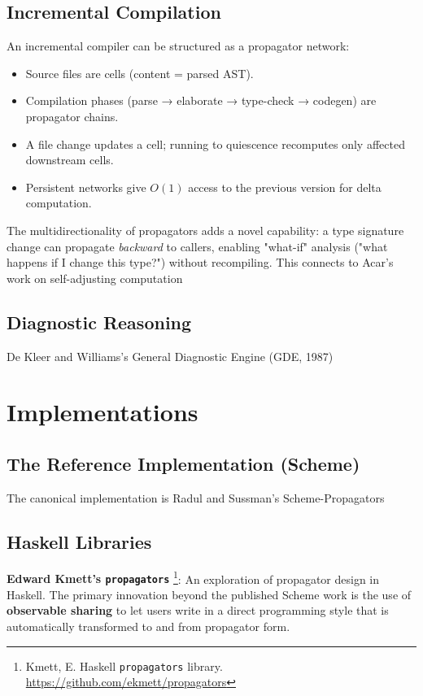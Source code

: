 \documentclass[11pt]{article}
\begin{document}
\subsection{Incremental Compilation}
\label{sec:orgc79f174}

An incremental compiler can be structured as a propagator network:

\begin{itemize}
\item Source files are cells (content = parsed AST).
\item Compilation phases (parse → elaborate → type-check → codegen) are
propagator chains.
\item A file change updates a cell; running to quiescence recomputes only
affected downstream cells.
\item Persistent networks give \(O(1)\) access to the previous version for
delta computation.
\end{itemize}

The multidirectionality of propagators adds a novel capability: a type
signature change can propagate \emph{backward} to callers, enabling "what-if"
analysis ("what happens if I change this type?") without recompiling.
This connects to Acar's work on self-adjusting computation
\subsection{Diagnostic Reasoning}
\label{sec:orgddc88f8}

De Kleer and Williams's General Diagnostic Engine (GDE, 1987)
\section{Implementations}
\label{sec:orgf1dc383}

\subsection{The Reference Implementation (Scheme)}
\label{sec:org7769237}

The canonical implementation is Radul and Sussman's Scheme-Propagators
\subsection{Haskell Libraries}
\label{sec:org9ae21d5}

\textbf{Edward Kmett's \texttt{propagators}} \footnote{Kmett, E. Haskell \texttt{propagators} library.
\url{https://github.com/ekmett/propagators}}: An exploration
of propagator design in Haskell. The primary innovation beyond the
published Scheme work is the use of \textbf{observable sharing} to let users
write in a direct programming style that is automatically transformed
to and from propagator form.
\end{document}
